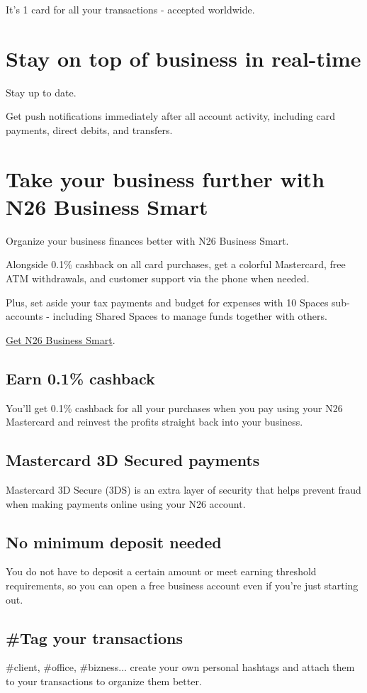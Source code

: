 \documentclass[onsided]{book}
\numberwithin{equation}{section}
\begin{document}
It's 1 card for all your transactions - accepted worldwide.

\section{Stay on top of business in real-time}
Stay up to date.

Get push notifications immediately after all account activity, including card payments, direct debits, and transfers.

\section{Take your business further with N26 Business Smart}
Organize your business finances better with N26 Business Smart.

Alongside 0.1\% cashback on all card purchases, get a colorful Mastercard, free ATM withdrawals, and customer support via the phone when needed.

Plus, set aside your tax payments and budget for expenses with 10 Spaces sub-accounts - including Shared Spaces to manage funds together with others.

\href{https://n26.com/en-eu/business-bank-account}{Get N26 Business Smart}.

\subsection{Earn 0.1\% cashback}
You'll get 0.1\% cashback for all your purchases when you pay using your N26 Mastercard and reinvest the profits straight back into your business.

\subsection{Mastercard 3D Secured payments}
Mastercard 3D Secure (3DS) is an extra layer of security that helps prevent fraud when making payments online using your N26 account.

\subsection{No minimum deposit needed}
You do not have to deposit a certain amount or meet earning threshold requirements, so you can open a free business account even if you're just starting out.

\subsection{\#Tag your transactions}
\#client, \#office, \#bizness$\ldots$ create your own personal hashtags and attach them to your transactions to organize them better.
\end{document}
